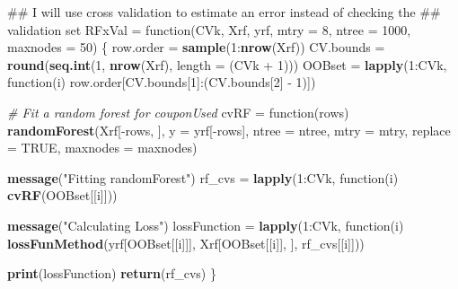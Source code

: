 \documentclass[10pt]{report}
\newenvironment{Shaded}{}{}
\newcommand{\KeywordTok}[1]{\textcolor[rgb]{0.00,0.44,0.13}{\textbf{{#1}}}}
\newcommand{\DataTypeTok}[1]{\textcolor[rgb]{0.56,0.13,0.00}{{#1}}}
\newcommand{\DecValTok}[1]{\textcolor[rgb]{0.25,0.63,0.44}{{#1}}}
\newcommand{\StringTok}[1]{\textcolor[rgb]{0.25,0.44,0.63}{{#1}}}
\newcommand{\CommentTok}[1]{\textcolor[rgb]{0.38,0.63,0.69}{\textit{{#1}}}}
\newcommand{\OtherTok}[1]{\textcolor[rgb]{0.00,0.44,0.13}{{#1}}}
\newcommand{\NormalTok}[1]{{#1}}
\begin{document}
\begin{Shaded}
\begin{Highlighting}[]
\NormalTok{## I will use cross validation to estimate an error instead of checking the}
\NormalTok{## validation set}
\NormalTok{RFxVal =}\StringTok{ }\NormalTok{function(CVk, Xrf, yrf, }\DataTypeTok{mtry =} \DecValTok{8}\NormalTok{, }\DataTypeTok{ntree =} \DecValTok{1000}\NormalTok{, }\DataTypeTok{maxnodes =} \DecValTok{50}\NormalTok{) \{}
    \NormalTok{row.order =}\StringTok{ }\KeywordTok{sample}\NormalTok{(}\DecValTok{1}\NormalTok{:}\KeywordTok{nrow}\NormalTok{(Xrf))}
    \NormalTok{CV.bounds =}\StringTok{ }\KeywordTok{round}\NormalTok{(}\KeywordTok{seq.int}\NormalTok{(}\DecValTok{1}\NormalTok{, }\KeywordTok{nrow}\NormalTok{(Xrf), }\DataTypeTok{length =} \NormalTok{(CVk +}\StringTok{ }\DecValTok{1}\NormalTok{)))}
    \NormalTok{OOBset =}\StringTok{ }\KeywordTok{lapply}\NormalTok{(}\DecValTok{1}\NormalTok{:CVk, function(i) row.order[CV.bounds[}\DecValTok{1}\NormalTok{]:(CV.bounds[}\DecValTok{2}\NormalTok{] -}\StringTok{ }
\StringTok{        }\DecValTok{1}\NormalTok{)])}
    
    \CommentTok{# Fit a random forest for couponUsed}
    \NormalTok{cvRF =}\StringTok{ }\NormalTok{function(rows) }\KeywordTok{randomForest}\NormalTok{(Xrf[-rows, ], }\DataTypeTok{y =} \NormalTok{yrf[-rows], }\DataTypeTok{ntree =} \NormalTok{ntree, }
        \DataTypeTok{mtry =} \NormalTok{mtry, }\DataTypeTok{replace =} \OtherTok{TRUE}\NormalTok{, }\DataTypeTok{maxnodes =} \NormalTok{maxnodes)}
    
    \KeywordTok{message}\NormalTok{(}\StringTok{"Fitting randomForest"}\NormalTok{)}
    \NormalTok{rf_cvs =}\StringTok{ }\KeywordTok{lapply}\NormalTok{(}\DecValTok{1}\NormalTok{:CVk, function(i) }\KeywordTok{cvRF}\NormalTok{(OOBset[[i]]))}
    
    \KeywordTok{message}\NormalTok{(}\StringTok{"Calculating Loss"}\NormalTok{)}
    \NormalTok{lossFunction =}\StringTok{ }\KeywordTok{lapply}\NormalTok{(}\DecValTok{1}\NormalTok{:CVk, function(i) }\KeywordTok{lossFunMethod}\NormalTok{(yrf[OOBset[[i]]], }
        \NormalTok{Xrf[OOBset[[i]], ], rf_cvs[[i]]))}
    
    \KeywordTok{print}\NormalTok{(lossFunction)}
    \KeywordTok{return}\NormalTok{(rf_cvs)}
\NormalTok{\}}


\end{Highlighting}
\end{Shaded}
\end{document}
